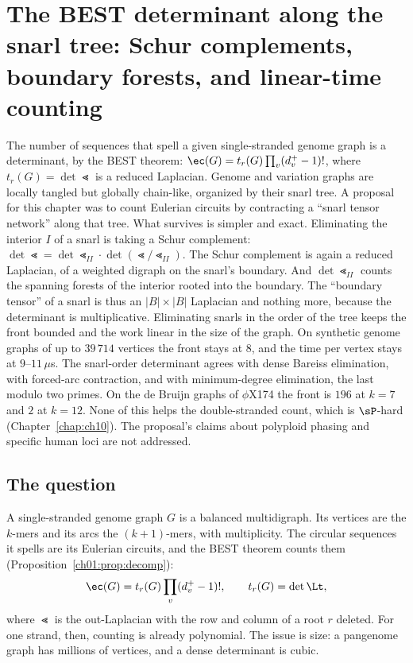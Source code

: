 \chapter[The BEST determinant along the snarl tree]{The BEST determinant along the snarl tree: Schur complements, boundary forests, and linear-time counting}\label{chap:ch16}
\begin{chaptersummary}
The number of sequences that spell a given single-stranded genome graph is a determinant, by the BEST
theorem: $\ec(G)=t_r(G)\prod_v(d^+_v-1)!$, where $t_r(G)=\det\Lt$ is a reduced Laplacian. Genome and
variation graphs are locally tangled but globally chain-like, organized by their snarl tree. A proposal
for this chapter was to count Eulerian circuits by contracting a ``snarl tensor network'' along that tree.
What survives is simpler and exact. Eliminating the interior $I$ of a snarl is taking a Schur complement:
$\det\Lt=\det\Lt_{II}\cdot\det(\Lt/\Lt_{II})$. The Schur complement is again a reduced Laplacian, of a
weighted digraph on the snarl's boundary. And $\det\Lt_{II}$ counts the spanning forests of the interior
rooted into the boundary. The ``boundary tensor'' of a snarl is thus an $|B|\times|B|$ Laplacian and
nothing more, because the determinant is multiplicative. Eliminating snarls in the order of the tree
keeps the front bounded and the work linear in the size of the graph. On synthetic genome graphs of up to
$39\,714$ vertices the front stays at $8$, and the time per vertex stays at $9$--$11\,\mu$s. The
snarl-order determinant agrees with dense Bareiss elimination, with forced-arc contraction, and with
minimum-degree elimination, the last modulo two primes. On the de Bruijn graphs of $\phi$X174 the front
is $196$ at $k=7$ and $2$ at $k=12$. None of this helps the double-stranded count, which is
$\sP$-hard (Chapter~\ref{chap:ch10}). The proposal's claims about polyploid phasing and specific human loci are not
addressed.
\end{chaptersummary}

\section{The question}\label{ch16:sec:q}

A single-stranded genome graph $G$ is a balanced multidigraph. Its vertices are the $k$-mers and its arcs
the $(k+1)$-mers, with multiplicity. The circular sequences it spells are its Eulerian circuits, and the
BEST theorem counts them \cite{BEST} (Proposition~\ref{ch01:prop:decomp}):
\[
\ec(G)=t_r(G)\prod_v(d^+_v-1)!,\qquad t_r(G)=\det\Lt,
\]
where $\Lt$ is the out-Laplacian with the row and column of a root $r$ deleted. For one strand, then,
counting is already polynomial. The issue is size: a pangenome graph has millions of vertices, and a
dense determinant is cubic.

